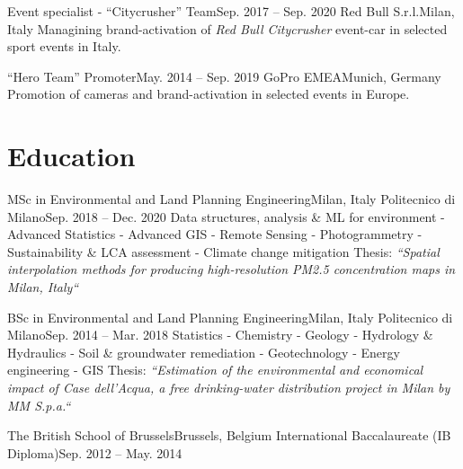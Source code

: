 \subHeading
{Event specialist - “Citycrusher” Team}{Sep. 2017 -- Sep. 2020}
{Red Bull S.r.l.}{Milan, Italy}
{Managining brand-activation of \textit{Red Bull Citycrusher} event-car in selected sport
  events in Italy.}

\subHeading
{“Hero Team” Promoter}{May. 2014 -- Sep. 2019}
{GoPro EMEA}{Munich, Germany}
{Promotion of cameras and brand-activation in selected events in Europe.}

\subHeadingListEnd


\section{Education}
\subHeadingListStart

\subHeading
{MSc in Environmental and Land Planning Engineering}{Milan, Italy}
{Politecnico di Milano}{Sep. 2018 -- Dec. 2020}
{\scriptsize Data structures, analysis \& ML for environment - Advanced Statistics - Advanced GIS -
  Remote Sensing - Photogrammetry -
  Sustainability \& LCA assessment - Climate change mitigation\newline
  {\scriptsize Thesis: \it “Spatial interpolation methods for producing high-resolution PM2.5
    concentration maps in Milan, Italy“}}

\subHeading
{BSc in Environmental and Land Planning Engineering}{Milan, Italy}
{Politecnico di Milano}{Sep. 2014 -- Mar. 2018}
{\scriptsize Statistics - Chemistry - Geology - Hydrology \& Hydraulics
  - Soil \& groundwater remediation - Geotechnology - Energy engineering - GIS\newline
  {\scriptsize Thesis: \it “Estimation of the environmental and economical impact of Case dell'Acqua,
    a free drinking-water distribution project in Milan by MM S.p.a.“}}

\subHeading
{The British School of Brussels}{Brussels, Belgium}
{International Baccalaureate (IB Diploma)}{Sep. 2012 -- May. 2014}{}
\subHeadingListEnd

